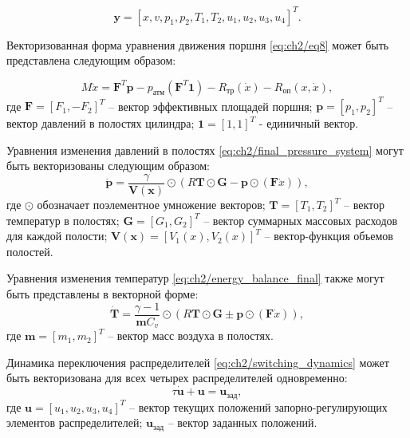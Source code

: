\begin{equation}
\label{eq:ch2/state_vector}
    \mathbf{y} = [x, v, p_1, p_2, T_1, T_2, u_1, u_2, u_3, u_4]^T.
\end{equation}

Векторизованная форма уравнения движения поршня \eqref{eq:ch2/eq8} может быть представлена следующим образом:

\begin{equation}
\label{eq:ch2/vec_motion}
    M\ddot{x} = \mathbf{F}^T\mathbf{p} - p_\text{атм}(\mathbf{F}^T\mathbf{1}) - R_\text{тр}(\dot{x}) - R_\text{оп}(x, \dot{x}),
\end{equation}
где $\mathbf{F} = [F_1, -F_2]^T$ -- вектор эффективных площадей поршня;
$\mathbf{p} = [p_1, p_2]^T$ -- вектор давлений в полостях цилиндра;
$\mathbf{1} = [1, 1]^T$ - единичный вектор.

Уравнения изменения давлений в полостях \eqref{eq:ch2/final_pressure_system} могут быть векторизованы следующим образом:
\begin{equation}
\label{eq:ch2/vec_pressure}
    \dot{\mathbf{p}} = \frac{\gamma}{\mathbf{V}(\mathbf{x})} \odot (R\mathbf{T} \odot \mathbf{G} - \mathbf{p} \odot (\mathbf{F}\dot{x})),
\end{equation}
где $\odot$ обозначает поэлементное умножение векторов;
$\mathbf{T} = [T_1, T_2]^T$ -- вектор температур в полостях;
$\mathbf{G} = [G_1, G_2]^T$ -- вектор суммарных массовых расходов для каждой полости;
$\mathbf{V}(\mathbf{x}) = [V_1(x), V_2(x)]^T$ -- вектор-функция объемов полостей.

Уравнения изменения температур \eqref{eq:ch2/energy_balance_final} также могут быть представлены в векторной форме:
\begin{equation}
\label{eq:ch2/vec_temperature}
    \dot{\mathbf{T}} = \frac{\gamma-1}{\mathbf{m}C_v} \odot (R\mathbf{T} \odot \mathbf{G} \pm \mathbf{p} \odot (\mathbf{F}\dot{x})),
\end{equation}
где $\mathbf{m} = [m_1, m_2]^T$ -- вектор масс воздуха в полостях.

Динамика переключения распределителей \eqref{eq:ch2/switching_dynamics} может быть векторизована для всех четырех распределителей одновременно:
\begin{equation}
\label{eq:ch2/vec_switching}
    \tau \dot{\mathbf{u}} + \mathbf{u} = \mathbf{u}_\text{зад},
\end{equation}
где $\mathbf{u} = [u_1, u_2, u_3, u_4]^T$ -- вектор текущих положений запорно-регулирующих элементов распределителей;
$\mathbf{u}_\text{зад}$ -- вектор заданных положений.

